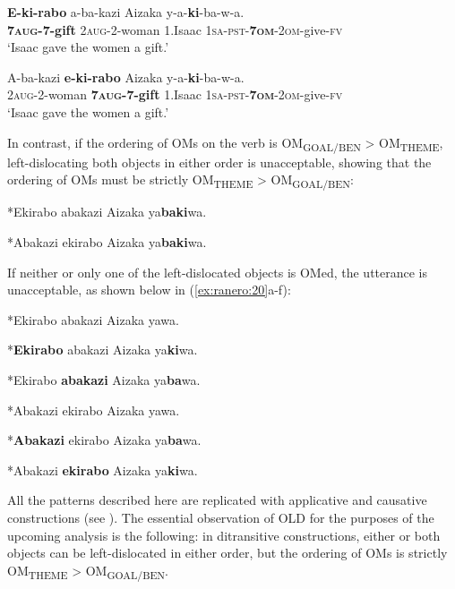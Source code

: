 \documentclass[output=paper
,newtxmath
,modfonts
,nonflat]{langsci/langscibook}
\begin{document}
\ea\label{ex:ranero:18}
\ea\label{ex:ranero:18a}
\gll \textbf{E-ki-rabo} a-ba-kazi           Aizaka y-a-\textbf{ki}{}-ba{}-w-a.\\
\textbf{7\textsc{aug}}\textbf{{}-7-gift} 2\textsc{aug}{}-2-woman 1.Isaac \textsc{1sa-pst-}\textbf{\textsc{7om}}\textsc{{}-}\textsc{2om}{}-give-\textsc{fv}\\
\glt ‘Isaac gave the women a gift.’

\ex\label{ex:ranero:18b}
\gll A-ba-kazi          \textbf{e-ki-rabo} Aizaka y-a-\textbf{ki}{}-ba{}-w-a.\\
\textsc{2aug}{}-2-woman \textbf{\textsc{7aug}}\textbf{{}-7-gift} 1.Isaac \textsc{1sa-pst-}\textbf{\textsc{7om}}\textsc{{}-}\textsc{2om}{}-give-\textsc{fv}\\
\glt ‘Isaac gave the women a gift.’
\z
\z

In contrast, if the ordering of OMs on the verb is OM\textsubscript{GOAL/BEN} > OM\textsubscript{THEME}, left-dislocating both objects in either order is unacceptable, showing that the ordering of OMs must be strictly OM\textsubscript{THEME} > OM\textsubscript{GOAL/BEN}:

\ea\label{ex:ranero:19}
\ea\label{ex:ranero:19a}
*Ekirabo abakazi Aizaka ya\textbf{baki}wa.  

\ex\label{ex:ranero:19b}
*Abakazi ekirabo  Aizaka ya\textbf{baki}wa.
\z
\z

If neither or only one of the left-dislocated objects is OMed, the utterance is unacceptable, as shown below in (\ref{ex:ranero:20}a-f):

\ea\label{ex:ranero:20} 
\ea\label{ex:ranero:20a}
*Ekirabo abakazi Aizaka yawa.

\ex\label{ex:ranero:20b}
*\textbf{Ekirabo} abakazi Aizaka ya\textbf{ki}wa.  

\ex\label{ex:ranero:20c}
*Ekirabo \textbf{abakazi} Aizaka ya\textbf{ba}wa.  

\ex\label{ex:ranero:20d}
*Abakazi ekirabo Aizaka yawa.

\ex\label{ex:ranero:20e}
*\textbf{Abakazi} ekirabo Aizaka ya\textbf{ba}wa.

\ex\label{ex:ranero:20f}
*Abakazi \textbf{ekirabo} Aizaka ya\textbf{ki}wa.
\z
\z

All the patterns described here are replicated with applicative and causative constructions (see \citealt{ranero2015}). The essential observation of OLD for the purposes of the upcoming analysis is the following: in ditransitive constructions, either or both objects can be left-dislocated in either order, but the ordering of OMs is strictly OM\textsubscript{THEME} > OM\textsubscript{GOAL/BEN}. 
\end{document}
